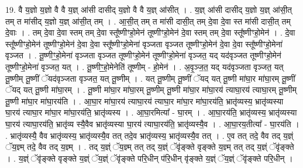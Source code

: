 \documentclass[17pt]{extarticle}
\begin{document}
19. वै य॒ज्ञो य॒ज्ञो वै वै य॒ज्ञ् आ॑सी दासीद् य॒ज्ञो वै वै य॒ज्ञ् आ॑सीत् । . य॒ज्ञ् आ॑सी दासीद् य॒ज्ञो य॒ज्ञ् आ॑सी॒त् तम् त मा॑सीद् य॒ज्ञो य॒ज्ञ् आ॑सी॒त् तम् । . आ॒सी॒त् तम् त मा॑सी दासी॒त् तम् दे॒वा दे॒वा स्त मा॑सी दासी॒त् तम् दे॒वाः । . तम् दे॒वा दे॒वा स्तम् तम् दे॒वा स्तू᳚ष्णीꣳहो॒मेन॑ तूष्णीꣳहो॒मेन॑ दे॒वा स्तम् तम् दे॒वा 
स्तू᳚ष्णीꣳहो॒मेन॑ । . दे॒वा स्तू᳚ष्णीꣳहो॒मेन॑ तूष्णीꣳहो॒मेन॑ दे॒वा दे॒वा स्तू᳚ष्णीꣳहो॒मेना॑ वृञ्जता वृञ्जत तूष्णीꣳहो॒मेन॑ दे॒वा दे॒वा स्तू᳚ष्णीꣳहो॒मेना॑ वृञ्जत । . तू॒ष्णीꣳ॒॒हो॒मेना॑ वृञ्जता वृञ्जत तूष्णीꣳहो॒मेन॑ तूष्णीꣳहो॒मेना॑ वृञ्जत॒ यद् यद॑वृञ्जत तूष्णीꣳहो॒मेन॑ तूष्णीꣳहो॒मेना॑ वृञ्जत॒ यत् । . तू॒ष्णीꣳ॒॒हो॒मेनेति॑ तूष्णीम् - हो॒मेन॑ । . अ॒वृ॒ञ्ज॒त॒ यद् यद॑वृञ्जता वृञ्जत॒ यत् तू॒ष्णीम् तू॒ष्णीं ॅयद॑वृञ्जता वृञ्जत॒ यत् तू॒ष्णीम् । . यत् तू॒ष्णीम् तू॒ष्णीं ॅयद् यत् तू॒ष्णी मा॑घा॒र मा॑घा॒रम् तू॒ष्णीं ॅयद् यत् तू॒ष्णी मा॑घा॒रम् । . तू॒ष्णी मा॑घा॒र मा॑घा॒रम् तू॒ष्णीम् तू॒ष्णी मा॑घा॒र मा॑घा॒रय॑ त्याघा॒रय॑ त्याघा॒रम् तू॒ष्णीम् तू॒ष्णी मा॑घा॒र मा॑घा॒रय॑ति । . आ॒घा॒र मा॑घा॒रय॑ त्याघा॒रय॑ त्याघा॒र मा॑घा॒र मा॑घा॒रय॑ति॒ भ्रातृ॑व्यस्य॒ भ्रातृ॑व्यस्या घा॒रय॑ त्याघा॒र मा॑घा॒र मा॑घा॒रय॑ति॒ भ्रातृ॑व्यस्य । . आ॒घा॒रमित्या᳚ - घा॒रम् । . आ॒घा॒रय॑ति॒ भ्रातृ॑व्यस्य॒ भ्रातृ॑व्यस्या घा॒रय॑ त्याघा॒रय॑ति॒ भ्रातृ॑व्य स्यै॒वैव भ्रातृ॑व्यस्या घा॒रय॑ त्याघा॒रय॑ति॒ भ्रातृ॑व्यस्यै॒व । . आ॒घा॒रय॒तीत्या᳚ - घा॒रय॑ति । . भ्रातृ॑व्यस्यै॒ वैव भ्रातृ॑व्यस्य॒ भ्रातृ॑व्यस्यै॒व तत् तदे॒व भ्रातृ॑व्यस्य॒ भ्रातृ॑व्यस्यै॒व तत् । . ए॒व तत् तदे॒ वैव तद् य॒ज्ञ्ं ॅय॒ज्ञ्म् तदे॒ वैव तद् य॒ज्ञ्म् । . तद् य॒ज्ञ्ं ॅय॒ज्ञ्म् तत् तद् य॒ज्ञ्ं ॅवृ॑ङ्क्ते वृङ्क्ते य॒ज्ञ्म् तत् तद् य॒ज्ञ्ं ॅवृ॑ङ्क्ते । . य॒ज्ञ्ं ॅवृ॑ङ्क्ते वृङ्क्ते य॒ज्ञ्ं ॅय॒ज्ञ्ं ॅवृ॑ङ्क्ते परि॒धीन् प॑रि॒धीन् वृ॑ङ्क्ते य॒ज्ञ्ं ॅय॒ज्ञ्ं ॅवृ॑ङ्क्ते परि॒धीन् । \newline
\end{document}
